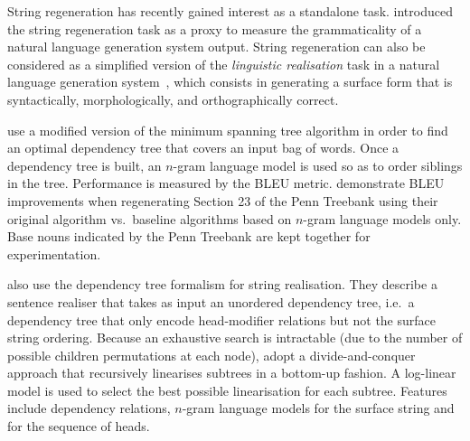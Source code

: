 String regeneration has recently gained interest as
a standalone
task.%
%
%
%
\citet{wan-dras-dale-paris:2009:EACL} introduced the string regeneration
task as a proxy to measure the grammaticality of a
natural language generation system output.
String regeneration can also be considered as a simplified version
of the \emph{linguistic realisation} task in a natural language
generation system~\citep{reiter-dale:1997:JNLE}, which consists in
generating a surface form that is syntactically, morphologically,
and orthographically correct.

\citet{wan-dras-dale-paris:2009:EACL} use a
modified version of the minimum spanning tree algorithm
in order to find an optimal dependency tree that covers an input bag of words.
Once a dependency tree is built, an $n$-gram language model is used
so as to order siblings in the tree.
Performance is measured by the BLEU metric.
\citet{wan-dras-dale-paris:2009:EACL} demonstrate BLEU
improvements when regenerating Section 23 of the
Penn Treebank using their original algorithm vs.\ baseline
algorithms based on $n$-gram language models only. Base nouns
indicated by the Penn Treebank are kept together for experimentation.


\citet{he-wang-guo-liu:2009:ACLIJCNLP} also use the dependency tree
formalism for string realisation. They describe a sentence
realiser that takes as input an unordered dependency tree, i.e.\ a dependency
tree that only encode head-modifier relations but not the surface
string ordering. Because an exhaustive search is intractable (due to
the number of possible children permutations at each node), \citet{he-wang-guo-liu:2009:ACLIJCNLP}
adopt a divide-and-conquer approach that recursively linearises
subtrees in a bottom-up fashion. A log-linear model is used
to select the best possible linearisation for each subtree.
Features include dependency relations, $n$-gram language models
for the surface string and for the sequence of heads.

